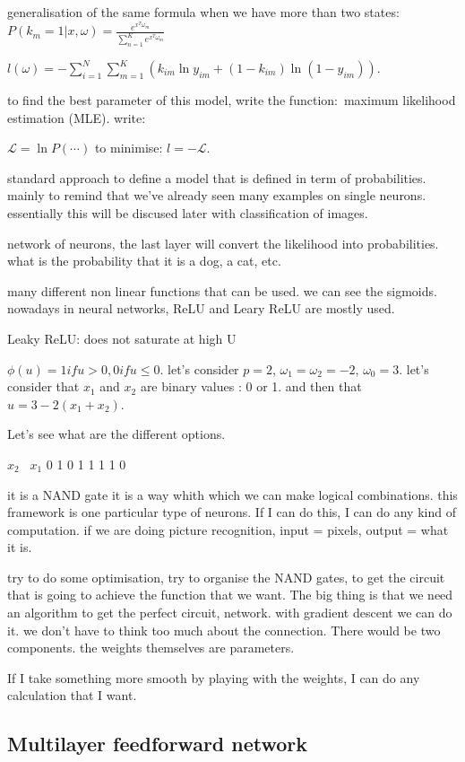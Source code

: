 \documentclass[a4paper]{tufte-book}
\newcommand{\sumin}{\sum_{i=1}^N}
\begin{document}
generalisation of the same formula when we have more than two states:
$P(k_m = 1|x,\omega) = \frac{e^{x^T\omega_m}}{\sum_{n=1}^K e^{x^T\omega_m}}$

$l(\omega) = -\sumin \sum_{m=1}^K (k_{im} \ln y_{im} + (1-k_{im})\ln (1-y_{im}))$.

to find the best parameter of this model, write the function: maximum likelihood
estimation (MLE). write:

$\mathcal{L} = \ln P(\cdots)$
to minimise: $l = - \mathcal{L}$.

standard approach to define a model that is defined in term of probabilities.
mainly to remind that we've already seen many examples on single neurons.
essentially this will be discused later with classification of images.

network of neurons, the last layer will convert the likelihood into probabilities.
what is the probability that it is a dog, a cat, etc.

many different non linear functions that can be used. we can see the sigmoids.
nowadays in neural networks, ReLU and Leary ReLU are mostly used.

Leaky ReLU: does not saturate at high U

$\phi(u) = 1 if u>0, 0 if u \leq 0$.
let's consider $p=2$, $\omega_1 = \omega_2 = -2$, $\omega_0 = 3$.
let's consider that $x_1$ and $x_2$ are binary values : 0 or 1.
and then that $u = 3-2(x_1+x_2)$.

Let's see what are the different options.

$x_2$ \ $x_1$   0   1
0               1   1
1               1   0

it is a NAND gate
it is a way whith which we can make logical combinations.
this framework is one particular type of neurons. If I can do this, I can do any
kind of computation.
if we are doing picture recognition, input = pixels, output = what it is.


try to do some optimisation, try to organise the NAND gates, to get the circuit
that is going to achieve the function that we want. The big thing is that 
we need an algorithm to get the perfect circuit, network. with gradient descent
we can do it.
we don't have to think too much about the connection.
There would be two components.
the weights themselves are parameters.

If I take something more smooth by playing with the weights, I can do any
calculation that I want.

\subsection{Multilayer feedforward network}
\end{document}
